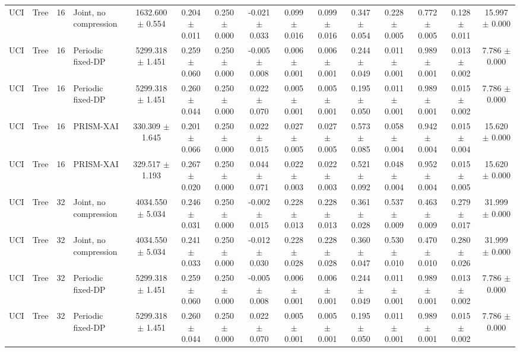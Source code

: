 \begin{table}[t]
\begin{tabular}{llllccccccccccc}
UCI & Tree & 16 & Joint, no compression & 1632.600 $\pm$ 0.554 & 0.204 $\pm$ 0.011 & 0.250 $\pm$ 0.000 & -0.021 $\pm$ 0.033 & 0.099 $\pm$ 0.016 & 0.099 $\pm$ 0.016 & 0.347 $\pm$ 0.054 & 0.228 $\pm$ 0.005 & 0.772 $\pm$ 0.005 & 0.128 $\pm$ 0.011 & 15.997 $\pm$ 0.000 \\
UCI & Tree & 16 & Periodic fixed-DP & 5299.318 $\pm$ 1.451 & 0.259 $\pm$ 0.060 & 0.250 $\pm$ 0.000 & -0.005 $\pm$ 0.008 & 0.006 $\pm$ 0.001 & 0.006 $\pm$ 0.001 & 0.244 $\pm$ 0.049 & 0.011 $\pm$ 0.001 & 0.989 $\pm$ 0.001 & 0.013 $\pm$ 0.002 & 7.786 $\pm$ 0.000 \\
UCI & Tree & 16 & Periodic fixed-DP & 5299.318 $\pm$ 1.451 & 0.260 $\pm$ 0.044 & 0.250 $\pm$ 0.000 & 0.022 $\pm$ 0.070 & 0.005 $\pm$ 0.001 & 0.005 $\pm$ 0.001 & 0.195 $\pm$ 0.050 & 0.011 $\pm$ 0.001 & 0.989 $\pm$ 0.001 & 0.015 $\pm$ 0.002 & 7.786 $\pm$ 0.000 \\
UCI & Tree & 16 & PRISM-XAI & 330.309 $\pm$ 1.645 & 0.201 $\pm$ 0.066 & 0.250 $\pm$ 0.000 & 0.022 $\pm$ 0.015 & 0.027 $\pm$ 0.005 & 0.027 $\pm$ 0.005 & 0.573 $\pm$ 0.085 & 0.058 $\pm$ 0.004 & 0.942 $\pm$ 0.004 & 0.015 $\pm$ 0.004 & 15.620 $\pm$ 0.000 \\
UCI & Tree & 16 & PRISM-XAI & 329.517 $\pm$ 1.193 & 0.267 $\pm$ 0.020 & 0.250 $\pm$ 0.000 & 0.044 $\pm$ 0.071 & 0.022 $\pm$ 0.003 & 0.022 $\pm$ 0.003 & 0.521 $\pm$ 0.092 & 0.048 $\pm$ 0.004 & 0.952 $\pm$ 0.004 & 0.015 $\pm$ 0.005 & 15.620 $\pm$ 0.000 \\
UCI & Tree & 32 & Joint, no compression & 4034.550 $\pm$ 5.034 & 0.246 $\pm$ 0.031 & 0.250 $\pm$ 0.000 & -0.002 $\pm$ 0.015 & 0.228 $\pm$ 0.013 & 0.228 $\pm$ 0.013 & 0.361 $\pm$ 0.028 & 0.537 $\pm$ 0.009 & 0.463 $\pm$ 0.009 & 0.279 $\pm$ 0.017 & 31.999 $\pm$ 0.000 \\
UCI & Tree & 32 & Joint, no compression & 4034.550 $\pm$ 5.034 & 0.241 $\pm$ 0.033 & 0.250 $\pm$ 0.000 & -0.012 $\pm$ 0.030 & 0.228 $\pm$ 0.028 & 0.228 $\pm$ 0.028 & 0.360 $\pm$ 0.047 & 0.530 $\pm$ 0.010 & 0.470 $\pm$ 0.010 & 0.280 $\pm$ 0.026 & 31.999 $\pm$ 0.000 \\
UCI & Tree & 32 & Periodic fixed-DP & 5299.318 $\pm$ 1.451 & 0.259 $\pm$ 0.060 & 0.250 $\pm$ 0.000 & -0.005 $\pm$ 0.008 & 0.006 $\pm$ 0.001 & 0.006 $\pm$ 0.001 & 0.244 $\pm$ 0.049 & 0.011 $\pm$ 0.001 & 0.989 $\pm$ 0.001 & 0.013 $\pm$ 0.002 & 7.786 $\pm$ 0.000 \\
UCI & Tree & 32 & Periodic fixed-DP & 5299.318 $\pm$ 1.451 & 0.260 $\pm$ 0.044 & 0.250 $\pm$ 0.000 & 0.022 $\pm$ 0.070 & 0.005 $\pm$ 0.001 & 0.005 $\pm$ 0.001 & 0.195 $\pm$ 0.050 & 0.011 $\pm$ 0.001 & 0.989 $\pm$ 0.001 & 0.015 $\pm$ 0.002 & 7.786 $\pm$ 0.000 \\

\end{tabular}
\end{table}
